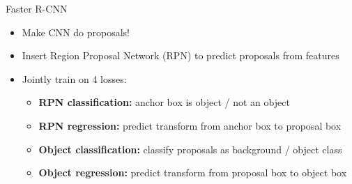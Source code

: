 \begin{frame}{Faster R-CNN}
\begin{itemize}
    \item Make CNN do proposals!
    \item Insert Region Proposal Network (RPN) to predict proposals from features
    \item<2-> Jointly train on 4 losses:
    \begin{itemize}
        \item \textbf{RPN classification:} anchor box is object / not an object
        \item \textbf{RPN regression:} predict transform from anchor box to proposal box
        \item \textbf{Object classification:} classify proposals as background / object class
        \item \textbf{Object regression:} predict transform from proposal box to object box
    \end{itemize}
\end{itemize}
\end{frame}

